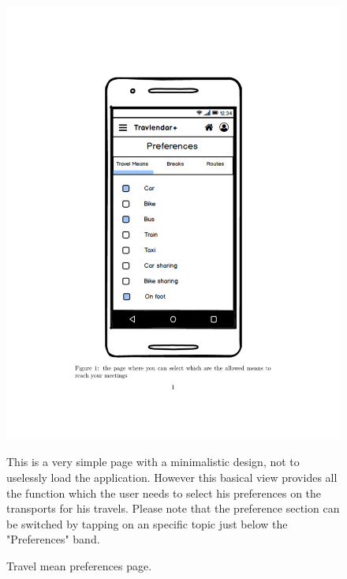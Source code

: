 	\begin{figure}
		\centering
		\includegraphics[width=0.6\linewidth]{mockups/PreferencesTravelMeans}
		\caption{Travel mean preferences page.}
		\label{fig:preferencestravelmeans}
			\begin{center}
			This is a very simple page with a minimalistic design, not to uselessly load the application. However this basical view provides all the function which the user needs to select his preferences on the transports for his travels. 
			Please note that the preference section can be switched by tapping on an specific topic just below the "Preferences" band.
			\end{center}
	\end{figure}

